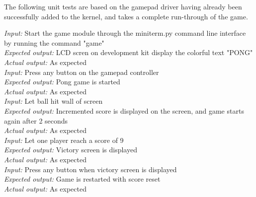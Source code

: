 The following unit tests are based on the gamepad driver having already been successfully added to the kernel, and takes a complete run-through of the game.

\emph{Input: } Start the game module through the miniterm.py command line interface by running the command "game"\\
\emph{Expected output: } LCD scren on development kit display the colorful text "PONG"\\
\emph{Actual output: } As expected \\

\emph{Input: } Press any button on the gamepad controller\\
\emph{Expected output: } Pong game is started\\
\emph{Actual output: } As expected \\

\emph{Input: } Let ball hit wall of screen\\
\emph{Expected output: } Incremented score is displayed on the screen, and game starts again after 2 seconds\\
\emph{Actual output: } As expected \\

\emph{Input: } Let one player reach a score of 9\\
\emph{Expected output: } Victory screen is displayed\\
\emph{Actual output: } As expected \\

\emph{Input: } Press any button when victory screen is displayed\\
\emph{Expected output: } Game is restarted with score reset\\
\emph{Actual output: } As expected \\